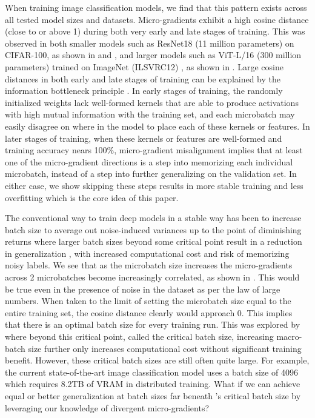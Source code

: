 When training image classification models, we find that this pattern exists across all tested model sizes and datasets. Micro-gradients exhibit a high cosine distance (close to or above 1) during both very early and late stages of training. This was observed in both smaller models such as ResNet18 (11 million parameters) on CIFAR-100, as shown in  and , and  larger models such as ViT-L/16 (300 million parameters) \cite{dosovitskiy2021an} trained on ImageNet (ILSVRC12) \cite{5206848}, as shown in . Large cosine distances in both early and late stages of training can be explained by the information bottleneck principle \cite{tishby2015deep}. In early stages of training, the randomly initialized weights lack well-formed kernels that are able to produce activations with high mutual information with the training set, and each microbatch may easily disagree on where in the model to place each of these kernels or features. In later stages of training, when these kernels or features are well-formed and training accuracy nears 100\%, micro-gradient misalignment implies that at least one of the micro-gradient directions is a step into memorizing each individual microbatch, instead of a step into further generalizing on the validation set. In either case, we show skipping these steps results in more stable training and less overfitting which is the core idea of this paper.

The conventional way to train deep models in a stable way has been to increase batch size to average out noise-induced variances up to the point of diminishing returns where larger batch sizes beyond some critical point result in a reduction in generalization \cite{keskar2016large,arpit2017closer,mccandlish2018empirical}, with increased computational cost and risk of memorizing noisy labels. We see that as the microbatch size increases the micro-gradients across 2 microbatches become increasingly correlated, as shown in . This would be true even in the presence of noise in the dataset as per the law of large numbers. When taken to the limit of setting the microbatch size equal to the entire training set, the cosine distance clearly would approach 0. This implies that there is an optimal batch size for every training run. This was explored by \citeauthor{mccandlish2018empirical} where beyond this critical point, called the critical batch size, increasing macro-batch size further only increases computational cost without significant training benefit. However, these critical batch sizes are still often quite large. For example, the current state-of-the-art image classification model uses a batch size of 4096 which requires 8.2TB of VRAM in distributed training. What if we can achieve equal or better generalization at batch sizes far beneath \citeauthor{mccandlish2018empirical}'s critical batch size by leveraging our knowledge of divergent micro-gradients? 

